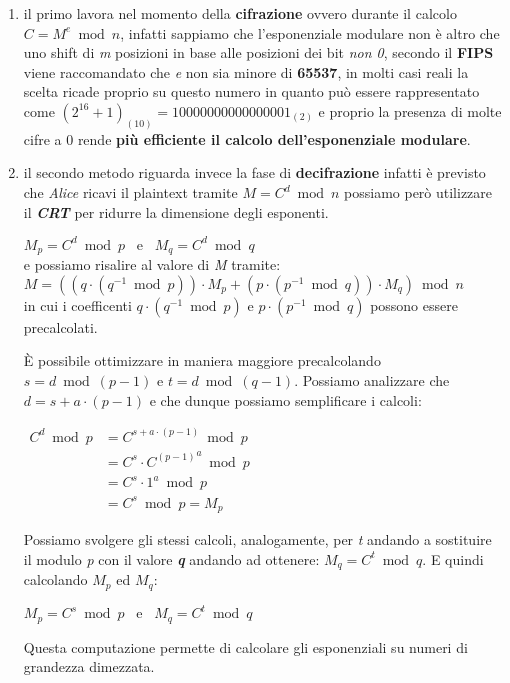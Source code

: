 \begin{enumerate}
    \item il primo lavora nel momento della \textbf{cifrazione} ovvero durante il calcolo $C = M^e \bmod n$, infatti sappiamo che l'esponenziale modulare non è altro che uno shift di \textit{m} posizioni in base alle posizioni dei bit \textit{non 0}, secondo il \textbf{FIPS} viene raccomandato che \textit{e} non sia minore di \textbf{65537}, in molti casi reali la scelta ricade proprio su questo numero in quanto può essere rappresentato come $(2^{16} + 1)_{(10)} = 10000000000000001_{(2)}$ e proprio la presenza di molte cifre a $0$ rende \textbf{più efficiente il calcolo dell'esponenziale modulare}.

    \item il secondo metodo riguarda invece la fase di \textbf{decifrazione} infatti è previsto che \textit{Alice} ricavi il plaintext tramite $M = C^d \bmod n$ possiamo però utilizzare il \textbf{\textit{CRT}} per ridurre la dimensione degli esponenti.
    \begin{center}
        $M_p = C^d \bmod p \;\;\; \text{e} \;\;\; M_q = C^d \bmod q$ \\
        e possiamo risalire al valore di \textit{M} tramite: \\
        $M = ((q \cdot (q^{-1} \bmod p)) \cdot M_p + (p \cdot (p^{-1} \bmod q)) \cdot M_q) \bmod n$ \\
        in cui i coefficenti $q \cdot (q^{-1} \bmod p)$ e $p \cdot (p^{-1} \bmod q)$ possono essere precalcolati.
    \end{center}
    È possibile ottimizzare in maniera maggiore precalcolando $s = d \bmod {(p - 1)}$ e $t = d \bmod {(q - 1)}$. Possiamo analizzare che $d = s + a \cdot (p - 1)$ e che dunque possiamo semplificare i calcoli:
    \begin{center}
        \begin{math}
            \begin{aligned}
                C^d \bmod p &= C^{s + a \cdot (p - 1)} \bmod p \\
                &= C^s \cdot {C^{(p - 1)}}^a \bmod p \\
                &= C^s \cdot 1^a \bmod p \\
                &= C^s \bmod p = M_p
            \end{aligned}
        \end{math}
    \end{center}
    Possiamo svolgere gli stessi calcoli, analogamente, per \textit{t} andando a sostituire il modulo \textit{p} con il valore \textbf{\textit{q}} andando ad ottenere: $M_q = C^t \bmod q$. E quindi calcolando $M_p$ ed $M_q$:
    \begin{center}
        $M_p = C^s \bmod p \;\;\; \text{e} \;\;\; M_q = C^t \bmod q$
    \end{center}
    Questa computazione permette di calcolare gli esponenziali su numeri di grandezza dimezzata.
\end{enumerate}
